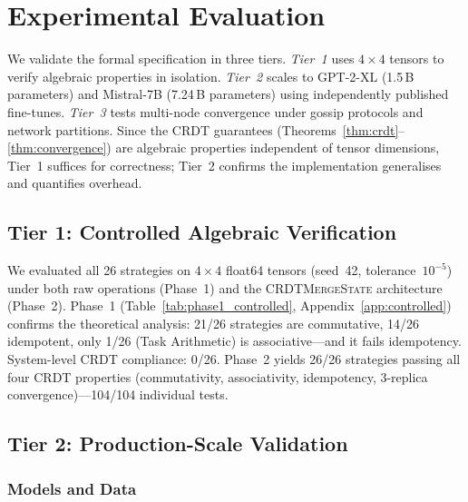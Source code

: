 \documentclass[10pt,letterpaper]{article}
\newcommand{\CMS}{\texorpdfstring{{\mdseries\upshape\textsc{CRDTMergeState}}}{CRDTMergeState}}
\begin{document}
\section{Experimental Evaluation}\label{sec:experiments}

We validate the formal specification in three tiers.
\emph{Tier~1} uses $4\times 4$ tensors to verify algebraic properties in isolation.
\emph{Tier~2} scales to GPT-2-XL (1.5\,B parameters) and Mistral-7B (7.24\,B parameters) using independently published fine-tunes.
\emph{Tier~3} tests multi-node convergence under gossip protocols and network partitions.
Since the CRDT guarantees (Theorems~\ref{thm:crdt}--\ref{thm:convergence}) are algebraic properties independent of tensor dimensions, Tier~1 suffices for correctness; Tier~2 confirms the implementation generalises and quantifies overhead.

\subsection{Tier 1: Controlled Algebraic Verification}\label{sec:tier1_phase1}

We evaluated all 26 strategies on $4\times 4$ float64 tensors (seed~42, tolerance~$10^{-5}$) under both raw operations (Phase~1) and the \CMS{} architecture (Phase~2).
Phase~1 (Table~\ref{tab:phase1_controlled}, Appendix~\ref{app:controlled}) confirms the theoretical analysis: 21/26 strategies are commutative, 14/26 idempotent, only 1/26 (Task Arithmetic) is associative---and it fails idempotency.  System-level CRDT compliance: 0/26.
Phase~2 yields 26/26 strategies passing all four CRDT properties (commutativity, associativity, idempotency, 3-replica convergence)---104/104 individual tests.

\subsection{Tier 2: Production-Scale Validation}\label{sec:production_scale}

\subsubsection{Models and Data}\label{sec:models}
\end{document}
